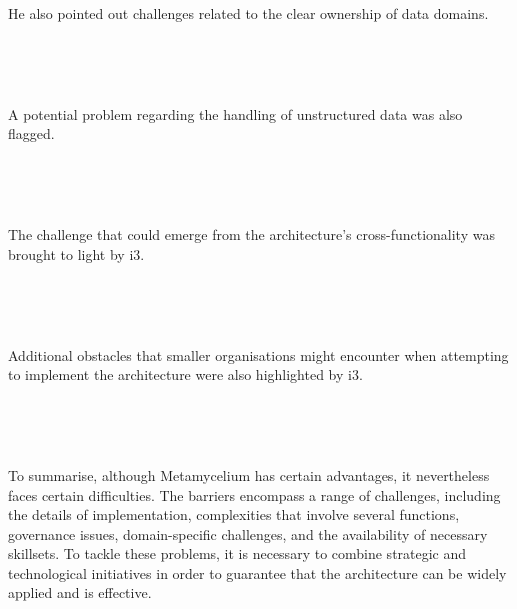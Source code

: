 \documentclass[journal]{IEEEtran}
\begin{document}
He also pointed out challenges related to the clear ownership of data domains.

\,

\setlength{\fboxsep}{0.3em}
\noindent{}

\,

A potential problem regarding the handling of unstructured data was also flagged.

\,

\setlength{\fboxsep}{0.3em}
\noindent{}

\,

The challenge that could emerge from the architecture's cross-functionality was brought to light by i3.

\,

\setlength{\fboxsep}{0.3em}
\noindent{}

\,

Additional obstacles that smaller organisations might encounter when attempting to implement the architecture were also highlighted by i3.

\,

\setlength{\fboxsep}{0.3em}
\noindent{}

\,

To summarise, although Metamycelium has certain advantages, it nevertheless faces certain difficulties. The barriers encompass a range of challenges, including the details of implementation, complexities that involve several functions, governance issues, domain-specific challenges, and the availability of necessary skillsets. To tackle these problems, it is necessary to combine strategic and technological initiatives in order to guarantee that the architecture can be widely applied and is effective.
\end{document}
